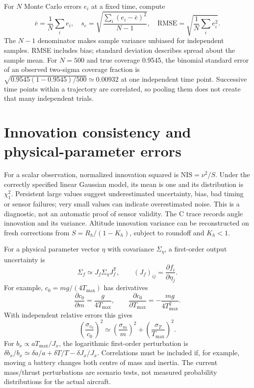 For $N$ Monte Carlo errors $e_i$ at a fixed time, compute
\begin{equation}
\bar e=\frac1N\sum_i e_i,\quad
s_e=\sqrt{\frac{\sum_i(e_i-\bar e)^2}{N-1}},\quad
\mathrm{RMSE}=\sqrt{\frac1N\sum_i e_i^2}.
\end{equation}
The $N-1$ denominator makes sample variance unbiased for independent samples.
RMSE includes bias; standard deviation describes spread about the sample mean.
For $N=500$ and true coverage 0.9545, the binomial standard error of an
observed two-sigma coverage fraction is
$\sqrt{0.9545(1-0.9545)/500}\simeq0.00932$ at one independent time point.
Successive time points within a trajectory are correlated, so pooling them
does not create that many independent trials.

\section{Innovation consistency and physical-parameter errors}
For a scalar observation, normalized innovation squared is
$\mathrm{NIS}=\nu^2/S$. Under the correctly specified linear Gaussian model,
its mean is one and its distribution is $\chi^2_1$. Persistent large values
suggest underestimated uncertainty, bias, bad timing or sensor failures;
very small values can indicate overestimated noise. This is a diagnostic,
not an automatic proof of sensor validity. The C trace records angle
innovation and its variance. Altitude innovation variance can be reconstructed
on fresh corrections from $S=R_h/(1-K_h)$, subject to roundoff and $K_h<1$.

For a physical parameter vector $\eta$ with covariance $\Sigma_\eta$, a
first-order output uncertainty is
\begin{equation}
\Sigma_f\simeq J_f\Sigma_\eta J_f^{\mathsf T},\qquad
(J_f)_{ij}=\frac{\partial f_i}{\partial\eta_j}.
\end{equation}
For example, $c_0=mg/(4T_{\max})$ has derivatives
\begin{equation}
\frac{\partial c_0}{\partial m}=\frac{g}{4T_{\max}},\qquad
\frac{\partial c_0}{\partial T_{\max}}=-\frac{mg}{4T_{\max}^2}.
\end{equation}
With independent
relative errors this gives
\begin{equation}
\left(\frac{\sigma_{c_0}}{c_0}\right)^2
\simeq\left(\frac{\sigma_m}{m}\right)^2
+\left(\frac{\sigma_T}{T_{\max}}\right)^2.
\end{equation}
For $b_x\propto aT_{\max}/J_x$, the logarithmic first-order perturbation is
$\delta b_x/b_x\simeq\delta a/a+\delta T/T-\delta J_x/J_x$.
Correlations must be included if, for example, moving a battery changes both
centre of mass and inertia. The current mass/thrust perturbations are scenario
tests, not measured probability distributions for the actual aircraft.

